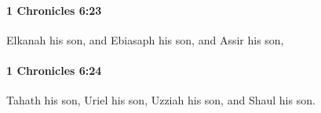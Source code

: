 		\paragraph{1 Chronicles 6:23} %
			\label{1CHRONICLES-6-23}

			Elkanah his son, and Ebiasaph his son, and Assir his son,


		\paragraph{1 Chronicles 6:24} %
			\label{1CHRONICLES-6-24}

			Tahath his son, Uriel his son, Uzziah his son, and Shaul his son.


